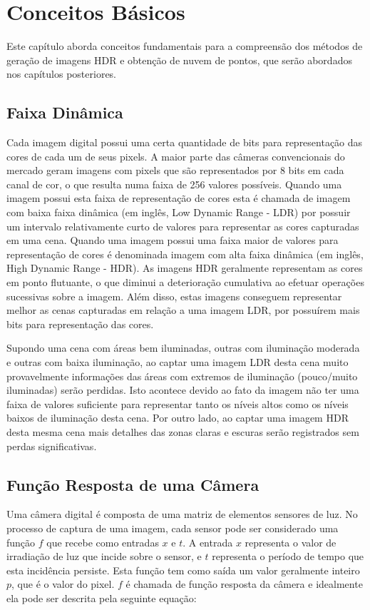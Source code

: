 \chapter{Conceitos Básicos} \label{conceitos}
	Este capítulo aborda conceitos fundamentais para a compreensão dos métodos de geração de imagens HDR e obtenção de nuvem de pontos, que serão abordados nos capítulos posteriores.
	
\section{Faixa Dinâmica} \label{conceitoFaixa}
    Cada imagem digital possui uma certa quantidade de bits para representação das cores de cada um de seus pixels. A maior parte das câmeras convencionais do mercado geram imagens com pixels que são representados por 8 bits em cada canal de cor, o que resulta numa faixa de 256 valores possíveis. Quando uma imagem possui esta faixa de representação de cores esta é chamada de imagem com baixa faixa dinâmica (em inglês, Low Dynamic Range - LDR) por possuir um intervalo relativamente curto de valores para representar as cores capturadas em uma cena. Quando uma imagem possui uma faixa maior de valores para representação de cores é denominada imagem com alta faixa dinâmica (em inglês, High Dynamic Range - HDR). As imagens HDR geralmente representam as cores em ponto flutuante, o que diminui a deterioração cumulativa ao efetuar operações sucessivas sobre a imagem. Além disso, estas imagens conseguem representar melhor as cenas capturadas em relação a uma imagem LDR, por possuírem mais bits para representação das cores.
    
    Supondo uma cena com áreas bem iluminadas, outras com iluminação moderada e outras com baixa iluminação, ao captar uma imagem LDR desta cena muito provavelmente informações das áreas com extremos de iluminação (pouco/muito iluminadas) serão perdidas. Isto acontece devido ao fato da imagem não ter uma faixa de valores suficiente para representar tanto os níveis altos como os níveis baixos de iluminação desta cena. Por outro lado, ao captar uma imagem HDR desta mesma cena mais detalhes das zonas claras e escuras serão registrados sem perdas significativas.
	
\section{Função Resposta de uma Câmera} \label{conceitoFR}
	Uma câmera digital é composta de uma matriz de elementos sensores de luz. No processo de captura de uma imagem, cada sensor pode ser considerado uma função $f$ que recebe como entradas $x$ e $t$. A entrada $x$ representa o valor de irradiação de luz que incide sobre o sensor, e $t$ representa o período de tempo que esta incidência persiste. Esta função tem como saída um valor geralmente inteiro $p$, que é o valor do pixel. $f$ é chamada de função resposta da câmera e idealmente ela pode ser descrita pela seguinte equação:
	
